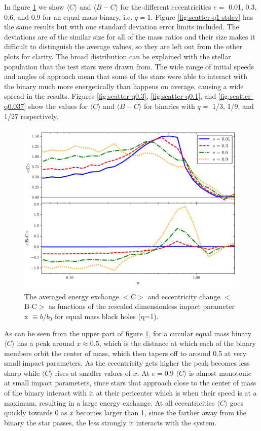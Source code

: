 \documentclass[english, oneside]{HYgradu}
\begin{document}
In figure \ref{fig:scatter-q1} we show $\langle C \rangle$ and $\langle B-C \rangle$ for the different eccentricities $e =$ 0.01, 0.3, 0.6, and 0.9 for an equal mass binary, i.e. $q = 1$. Figure \ref{fig:scatter-q1-stdev} has the same results but with one standard deviation error limits included. The deviations are of the similar size for all of the mass ratios and their size makes it difficult to distinguish the average values, so they are left out from the other plots for clarity. The broad distribution can be explained with the stellar population that the test stars were drawn from. The wide range of initial speeds and angles of approach mean that some of the stars were able to interact with the binary much more energetically than happens on average, causing a wide spread in the results. 
Figures \ref{fig:scatter-q0.3}, \ref{fig:scatter-q0.1}, and \ref{fig:scatter-q0.037} show the values for $\langle C \rangle$ and $\langle B-C \rangle$ for binaries with $q =$ 1/3, 1/9, and 1/27 respectively.

\begin{figure}[h!tb]
\centering
\includegraphics[scale=0.62]{../images/q1.pdf}
\caption{The averaged energy exchange $<$C$>$ and eccentricity change $<$B-C$>$ as functions of the rescaled dimensionless impact parameter x $\equiv b/b_0$ for equal mass black holes (q=1).}
\label{fig:scatter-q1}
\end{figure}

As can be seen from the upper part of figure \ref{fig:scatter-q1}, for a circular equal mass binary $\langle C \rangle$ has a peak around $x \approx 0.5$, which is the distance at which each of the binary members orbit the center of mass, which then tapers off to around 0.5 at very small impact parameters. As the eccentricity gets higher the peak becomes less sharp while $\langle C \rangle$ rises at smaller values of $x$. At $e = 0.9$ $\langle C \rangle$ is almost monotonic at small impact parameters, since stars that approach close to the center of mass of the binary interact with it at their pericenter which is when their speed is at a maximum, resulting in a large energy exchange. At all eccentricities $\langle C \rangle$ goes quickly towards 0 as $x$ becomes larger than 1, since the farther away from the binary the star passes, the less strongly it interacts with the system.
\end{document}
